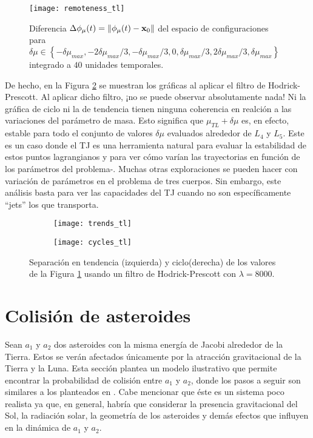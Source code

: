 \begin{figure}
 \centering
 \texttt{[image: remoteness\_tl]}
 \caption{Diferencia $\Delta\phi_\mu(t) = \left\lVert \phi_\mu(t) - \mathbf{x}_0 \right\rVert$ del espacio de configuraciones para $\delta\mu \in \left\lbrace -\delta\mu_{max}, -2\delta\mu_{max}/3, -\delta\mu_{max}/3, 0, \delta\mu_{max}/3, 2\delta\mu_{max}/3, \delta\mu_{max}  \right\rbrace$ integrado a $40$ unidades temporales.}
 \label{fig:remoteness_tl}
\end{figure}

De hecho, en la Figura \ref{fig:trendcycle_tl} se muestran los gráficas al aplicar el filtro de Hodrick-Prescott. Al aplicar dicho filtro, ¡no se puede observar absolutamente nada! Ni la gráfica de ciclo ni la de tendencia tienen ninguna coherencia en realción a las variaciones del parámetro de masa. Esto significa que $\mu_{TL} + \delta\mu$ es, en efecto, estable para todo el conjunto de valores $\delta\mu$ evaluados alrededor de $L_4$ y $L_5$. Este es un caso donde el TJ es una herramienta natural para evaluar la estabilidad de estos puntos lagrangianos y para ver cómo varían las trayectorias en función de los parámetros del problema-. Muchas otras exploraciones se pueden hacer con variación de parámetros en el problema de tres cuerpos. Sin embargo, este análisis basta para ver las capacidades del TJ cuando no son específicamente ``jets'' los que transporta.

\begin{figure}[h!]
\centering
\begin{subfigure}{0.49\textwidth}
	\centering
	\texttt{[image: trends\_tl]}
\end{subfigure}
%
\begin{subfigure}{0.49\textwidth}
	\centering
	\texttt{[image: cycles\_tl]}
\end{subfigure}
\caption{ Separación en tendencia (izquierda) y ciclo(derecha) de los valores de la Figura \ref{fig:remoteness_tl} usando un filtro de Hodrick-Prescott con $\lambda = 8000$.}
\label{fig:trendcycle_tl}
\end{figure}

\section{Colisión de asteroides}
\label{sec:asteroids}

Sean $a_1$ y $a_2$ dos asteroides con la misma energía de Jacobi alrededor de la Tierra. Estos se verán afectados únicamente por la atracción gravitacional de la Tierra y la Luna. Esta sección plantea un modelo ilustrativo que permite encontrar la probabilidad de colisión entre $a_1$ y $a_2$, donde los pasos a seguir son similares a los planteados en \cite{Perez2013}. Cabe mencionar que éste es un sistema poco realista ya que, en general, habría que considerar la presencia gravitacional del Sol, la radiación solar, la geometría de los asteroides y demás efectos que influyen en la dinámica de $a_1$ y $a_2$.

